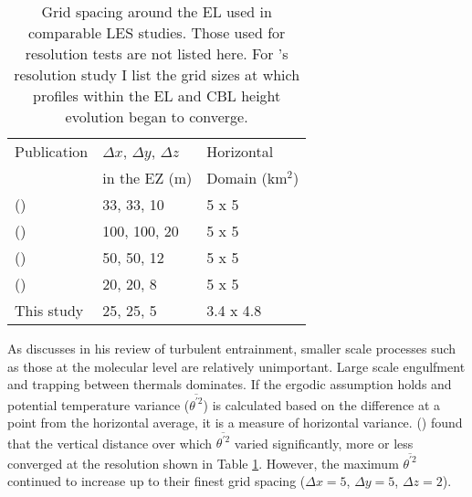 \begin{table}[htbp]
\caption[]{Grid spacing around the \acs{EL} used in comparable \acs{LES} studies. Those used for resolution tests are not listed here.  For \citeauthor{SullPat}'s \citeyear{SullPat} resolution study I list the grid sizes at which profiles within the \acs{EL} and \acs{CBL} height evolution began to converge.}

    \begin{center}
    \begin{tabular}{ p{5cm} p{3cm} p{3cm}}
Publication & $\Delta x$, $\Delta y$, $\Delta z$ & Horizontal \\
 & in the \acs{EZ} (m) & Domain (km$^{2}$) \\ \hline
      \citeauthor{SullMoengStev} (\citeyear{SullMoengStev}) & 33, 33, 10 & 5 x 5 \\ %
      \citeauthor{FedConzMir04} (\citeyear{FedConzMir04}) & 100, 100, 20 & 5 x 5 \\ [.3cm] %
      \citeauthor{BrooksFowler2} (\citeyear{BrooksFowler2}) & 50, 50, 12 & 5 x 5 \\%
      \citeauthor{SullPat} (\citeyear{SullPat}) &  20, 20, 8 & 5 x 5\\ %
      This study & 25, 25, 5 &  3.4 x 4.8\\ \hline       
    \end{tabular}
\label{table:gridcomp}   
\end{center}    
\end{table}


As \citeauthor{Turner86} discusses in his \citeyear{Turner86} review of turbulent entrainment, smaller scale processes such as those at the molecular level are relatively unimportant.  Large scale engulfment and trapping between thermals dominates.  If the ergodic assumption holds and potential temperature variance ($\overline{\theta^{'2}}$) is calculated based on the difference at a point from the horizontal average, it is a measure of horizontal variance.  \citeauthor{SullPat} (\citeyear{SullPat}) found that the vertical distance over which $\overline{\theta^{'2}}$ varied significantly, more or less converged at the resolution shown in Table \ref{table:gridcomp}.  However, the maximum $\overline{\theta^{'2}}$ continued to increase up to their finest grid spacing ($\Delta x=5$, $\Delta y = 5$, $\Delta z = 2$).\\

